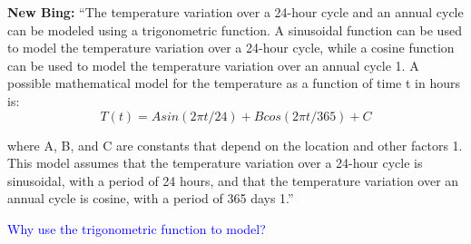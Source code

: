 \documentclass[11pt]{article} %
\begin{document}
\begin{mdframed}[
        backgroundcolor=white,  %
        linecolor=black,        %
        leftmargin=5pt,         %
        rightmargin=5pt,        %
        linewidth=2pt           %
    ]
    \textbf{New Bing: } “The temperature variation over a 24-hour cycle and an annual cycle can be modeled using a trigonometric function. A sinusoidal function can be used to model the temperature variation over a 24-hour cycle, while a cosine function can be used to model the temperature variation over an annual cycle 1.
    A possible mathematical model for the temperature as a function of time t in hours is:
    $$
        T(t) = A sin(2 \pi t/24) + B cos(2 \pi t/365) + C
    $$

    where A, B, and C are constants that depend on the location and other factors 1.
    This model assumes that the temperature variation over a 24-hour cycle is sinusoidal, with a period of 24 hours, and that the temperature variation over an annual cycle is cosine, with a period of 365 days 1.”

\end{mdframed}
% 
% 
% 
\textcolor{blue}{Why use the  trigonometric function to model?}
\end{document}

